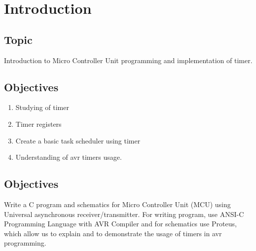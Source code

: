 \section*{\center Introduction}


\subsection*{Topic}
Introduction to Micro Controller Unit programming and implementation of timer.


\subsection*{Objectives}
\begin{enumerate}
	\item Studying of timer 
    \item Timer registers
    \item Create a basic task scheduler using timer 
    \item Understanding of avr timers usage.
\end{enumerate}


\subsection*{Objectives}
Write  a C program and schematics for Micro Controller Unit (MCU) using Universal asynchronous receiver/transmitter. For writing program, use ANSI-C Programming Language with AVR Compiler and for schematics use Proteus, which allow us to explain and to demonstrate the usage of timers in avr programming.

